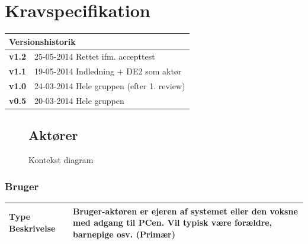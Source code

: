 \chapter{Kravspecifikation}

\begin{table}[!htbp] \centering
\begin{tabular}{|p{2cm}|p{8cm}|}
	\hline
		\multicolumn{2}{|l|}{Versionshistorik} \\\hline
		\textbf{v1.2} &25-05-2014 Rettet ifm. accepttest\\\hline	
		\textbf{v1.1} &19-05-2014 Indledning + DE2 som aktør\\\hline
		\textbf{v1.0} &24-03-2014 Hele gruppen (efter 1. review)\\\hline
		\textbf{v0.5} &20-03-2014 Hele gruppen\\\hline
	\end{tabular}
\end{table}



\begin{figure}[htbp] \centering
\section{Aktører}
\caption{Kontekst diagram}
\label{lab:kontekstdiagram}
\end{figure}

\begin{table}[!htbp] \centering
\subsection{Bruger}
\begin{tabular}{|p{4cm}|p{8cm}|}
	\hline
		\textbf{Type Beskrivelse} &
			Bruger-aktøren er ejeren af systemet eller den voksne med adgang til PCen. 
			Vil typisk være forældre, barnepige osv. (Primær) \\\hline
	\end{tabular}
\end{table}

